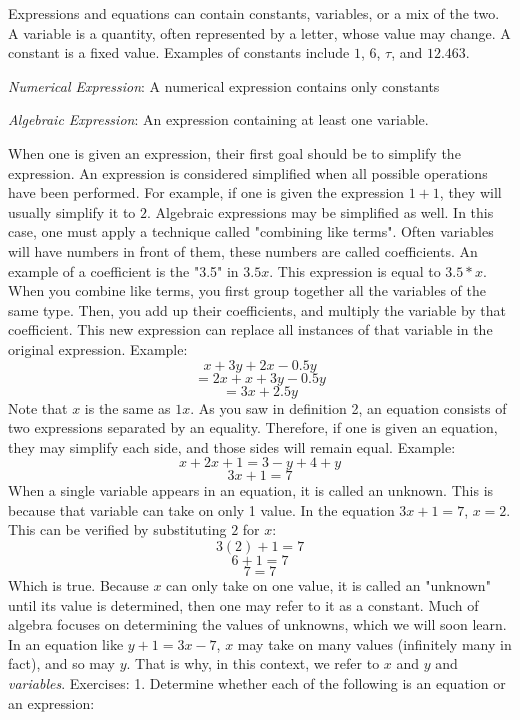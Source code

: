 Expressions and equations can contain constants, variables, or a mix of the two. 
A variable is a quantity, often represented by a letter, whose value may change.
A constant is a fixed value.
Examples of constants include $1$, $6$, $\tau$, and $12.463$.
\begin{definition}
    \textit{Numerical Expression}: A numerical expression contains only constants
\end{definition}
\begin{definition}
    \textit{Algebraic Expression}: An expression containing at least one variable.
\end{definition}
When one is given an expression, their first goal should be to simplify the expression.
An expression is considered simplified when all possible operations have been performed.
For example, if one is given the expression $1+1$, they will usually simplify it to $2$.
Algebraic expressions may be simplified as well.
In this case, one must apply a technique called "combining like terms".
Often variables will have numbers in front of them, these numbers are called coefficients.
An example of a coefficient is the "3.5" in $3.5x$.
This expression is equal to $3.5 * x$.
When you combine like terms, you first group together all the variables of the same type.
Then, you add up their coefficients, and multiply the variable by that coefficient.
This new expression can replace all instances of that variable in the original expression.
\newline \newline Example:
\[x + 3y + 2x - 0.5y\]
\[= 2x + x + 3y - 0.5y\]
\[= 3x + 2.5y\]
Note that $x$ is the same as $1x$.
\newline \newline
\indent As you saw in definition 2, an equation consists of two expressions separated by an equality.
Therefore, if one is given an equation, they may simplify each side, and those sides will remain equal.
Example:
\[x + 2x + 1 = 3 - y + 4 + y\]
\[3x + 1 = 7\]
\indent When a single variable appears in an equation, it is called an unknown.
This is because that variable can take on only 1 value.
In the equation $3x+1=7$, $x=2$.
This can be verified by substituting $2$ for $x$:
\[3(2)+1=7\]
\[6+1=7\]
\[7=7\]
Which is true.
\newline \indent Because $x$ can only take on one value, it is called an "unknown" until its value is determined, then one may refer to it as a constant.
Much of algebra focuses on determining the values of unknowns, which we will soon learn.
\newline \indent In an equation like $y + 1 = 3x -7$, $x$ may take on many values (infinitely many in fact), and so may $y$.
That is why, in this context, we refer to $x$ and $y$ and \textit{variables}.
\Large{Exercises:}
1. Determine whether each of the following is an equation or an expression:


